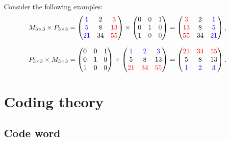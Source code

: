 \documentclass[11pt,
  oneside,openany,    %
]{scrreprt}
\begin{document}
Consider the following examples:
\begin{equation*}
  M_{3\times 3} \times P_{3\times 3} =
  \begin{pmatrix}
    \textcolor{blue}{1} & 2 & \textcolor{red}{3}\\
    \textcolor{blue}{5} & 8 & \textcolor{red}{13}\\
     \textcolor{blue}{21} & 34 & \textcolor{red}{55}
  \end{pmatrix}
%
\times
%
  \begin{pmatrix}
    0 & 0 & 1\\
    0 & 1 & 0\\
    1 & 0 & 0
  \end{pmatrix}
  = 
  \begin{pmatrix}
    \textcolor{red}{3} & 2 & \textcolor{blue}{1}\\
    \textcolor{red}{13} & 8 & \textcolor{blue}{5}\\
    \textcolor{red}{55} & 34 & \textcolor{blue}{21}
  \end{pmatrix},
\end{equation*}

\begin{equation*}
  P_{3\times 3} \times   M_{3\times 3} =
  \begin{pmatrix}
    0 & 0 & 1\\
    0 & 1 & 0\\
    1 & 0 & 0
  \end{pmatrix}
%
\times
%
  \begin{pmatrix}
    \textcolor{blue}{1} & \textcolor{blue}{2} & \textcolor{blue}{3}\\
    5 & 8 & 13\\
    \textcolor{red}{21} & \textcolor{red}{34} & \textcolor{red}{55}
  \end{pmatrix}
  = 
  \begin{pmatrix}
    \textcolor{red}{21} & \textcolor{red}{34} & \textcolor{red}{55}\\
    5 & 8 & 13\\
    \textcolor{blue}{1} & \textcolor{blue}{2} & \textcolor{blue}{3}
  \end{pmatrix}.
\end{equation*}

\section{Coding theory}

\subsection{Code word}
\end{document}
